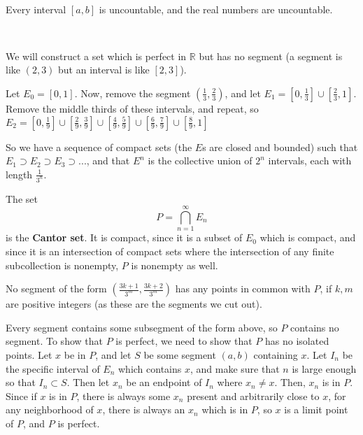 \documentclass{article}
\begin{document}
\begin{corollary}
\

Every interval $[a,b]$ is uncountable, and the real numbers are uncountable.
\end{corollary}

\begin{example}
\

We will construct a set which is perfect in $\mathbb{R}$ but has no segment (a segment is like $(2,3)$ but an interval is like $[2,3]$).

Let $E_0 = [0,1]$. Now, remove the segment $(\frac{1}{3}, \frac{2}{3})$, and let $E_1 = [0, \frac{1}{3}] \cup [\frac{2}{3}, 1]$. Remove the middle thirds of these intervals, and repeat, so $E_2 = [0, \frac{1}{9}] \cup [\frac{2}{9}, \frac{3}{9}] \cup [\frac{4}{9}, \frac{5}{9}] \cup [\frac{6}{9}, \frac{7}{9}] \cup [\frac{8}{9}, 1]$

So we have a sequence of compact sets (the $E$s are closed and bounded) such that $E_1 \supset E_2 \supset E_3 \supset ...$, and that $E^n$ is the collective union of $2^n$ intervals, each with length $\frac{1}{3^n}$.

The set $$P = \bigcap_{n=1}^\infty E_n$$is the \textbf{Cantor set}. It is compact, since it is a subset of $E_0$ which is compact, and since it is an intersection of compact sets where the intersection of any finite subcollection is nonempty, $P$ is nonempty as well.

No segment of the form $(\frac{3k+1}{3^m}, \frac{3k+2}{3^m})$ has any points in common with $P$, if $k,m$ are positive integers (as these are the segments we cut out).

Every segment contains some subsegment of the form above, so $P$ contains no segment. To show that $P$ is perfect, we need to show that $P$ has no isolated points. Let $x$ be in $P$, and let $S$ be some segment $(a,b)$ containing $x$. Let $I_n$ be the specific interval of $E_n$ which contains $x$, and make sure that $n$ is large enough so that $I_n \subset S$. Then let $x_n$ be an endpoint of $I_n$ where $x_n \neq x$. Then, $x_n$ is in $P$. Since if $x$ is in $P$, there is always some $x_n$ present and arbitrarily close to $x$, for any neighborhood of $x$, there is always an $x_n$ which is in $P$, so $x$ is a limit point of $P$, and $P$ is perfect.
\end{example}
\end{document}
